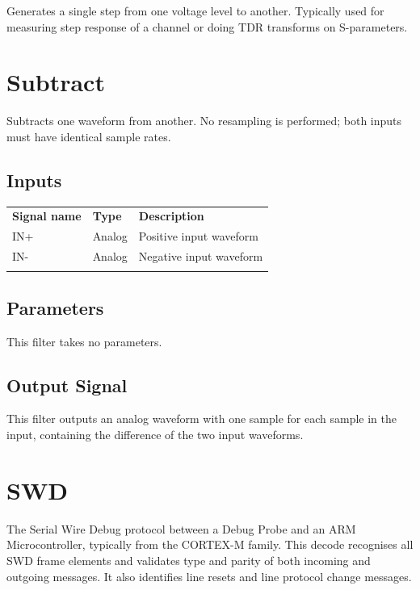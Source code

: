 Generates a single step from one voltage level to another. Typically used for measuring step response of a channel or
doing TDR transforms on S-parameters.

\pagebreak
\section{Subtract}


Subtracts one waveform from another. No resampling is performed; both inputs must have identical sample rates.

\subsection{Inputs}

\begin{tabularx}{16cm}{llX}
\thickhline
\textbf{Signal name} & \textbf{Type} & \textbf{Description} \\
\thickhline
IN+ & Analog & Positive input waveform \\
\thickhline
IN- & Analog & Negative input waveform \\
\thickhline
\end{tabularx}

\subsection{Parameters}

This filter takes no parameters.

\subsection{Output Signal}

This filter outputs an analog waveform with one sample for each sample in the input, containing the difference of the
two input waveforms.

\pagebreak
\section{SWD}

The Serial Wire Debug protocol between a Debug Probe and an ARM Microcontroller, typically from the CORTEX-M family. This
decode recognises all SWD frame elements and validates type and parity of both incoming and outgoing messages. It also
identifies line resets and line protocol change messages.


